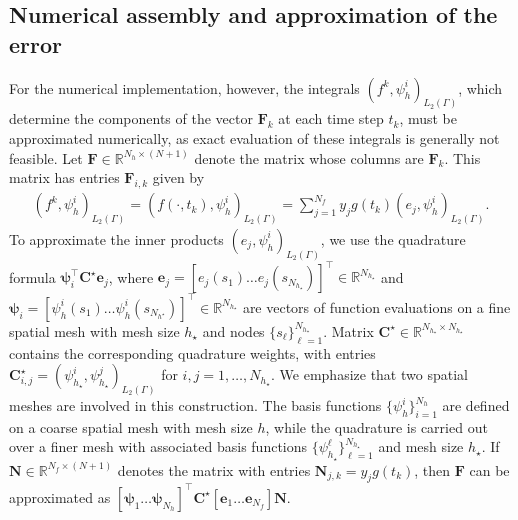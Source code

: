 \documentclass[numbers,webpdf]{ima-authoring-template}%
\theoremstyle{thmstyletwo}%
\numberwithin{equation}{section}
\begin{document}
\subsection{Numerical assembly and approximation of the error}
\label{errorcompsec}
For the numerical implementation, however, the integrals $(f^{k},\psi^i_h)_{L_2(\Gamma)}$, which determine the components of the vector $\mathbf{F}_k$ at each time step $t_k$, must be approximated numerically, as exact evaluation of these integrals is generally not feasible. Let $\mathbf{F}\in\mathbb{R}^{N_h\times (N+1)}$ denote the matrix whose columns are $\mathbf{F}_k$. This matrix has entries $\mathbf{F}_{i,k}$ given by
\begin{align*}
   \textstyle (f^{k},\psi^i_h)_{L_2(\Gamma)} = (f(\cdot,t_k),\psi^i_h)_{L_2(\Gamma)} = \sum_{j=1}^{N_f} y_j g(t_k) (e_j,\psi^i_h)_{L_2(\Gamma)}.
\end{align*}
To approximate the inner products $(e_j,\psi^i_h)_{L_2(\Gamma)}$, we use the quadrature formula $\boldsymbol{\psi}_i^\top\mathbf{C}^{\star}\mathbf{e}_j$, where $\mathbf{e}_j=[e_j(s_1)\dots e_j(s_{N_{h_{\star}}})]^\top\in\mathbb{R}^{N_{h_\star}}$ and $\boldsymbol{\psi}_i=[\psi^i_h(s_1)\dots \psi^i_h(s_{N_{h^\star}})]^\top\in\mathbb{R}^{N_{h_\star}}$  are vectors of function evaluations on a fine spatial mesh with mesh size $h_{\star}$ and nodes $\{s_\ell\}_{\ell=1}^{N_{h_{\star}}}$. Matrix $\mathbf{C}^{\star}\in\mathbb{R}^{N_{h_\star}\times N_{h_\star}}$ contains the corresponding quadrature weights, with entries $\mathbf{C}^{\star}_{i,j} = (\psi_{h_\star}^i,\psi_{h_\star}^j)_{L_2(\Gamma)}$ for $i,j = 1,\dots, N_{h_\star}$. We emphasize that two spatial meshes are involved in this construction. The basis functions $\{\psi^i_h\}_{i=1}^{N_h}$ are defined on a coarse spatial mesh with mesh size $h$, while the quadrature is carried out over a finer mesh with associated basis functions $\{\psi^\ell_{h_\star}\}_{\ell=1}^{N_{h_\star}}$ and mesh size $h_\star$.
If $\mathbf{N}\in\mathbb{R}^{N_{f}\times (N+1)}$ denotes the matrix with entries $\mathbf{N}_{j,k} = y_j g(t_k)$, then $\mathbf{F}$ can be approximated as $[\boldsymbol{\psi}_1\dots \boldsymbol{\psi}_{N_h}]^\top \mathbf{C}^{\star} [\mathbf{e}_1\dots \mathbf{e}_{N_f}] \mathbf{N}$. 
\end{document}
